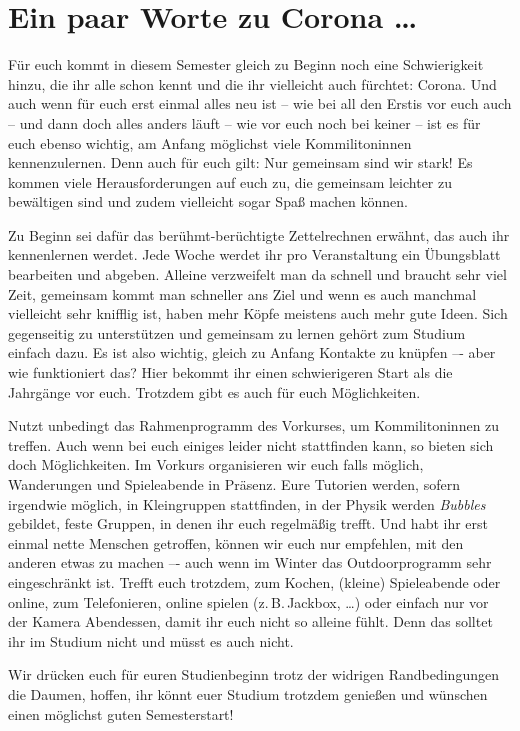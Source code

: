 \section{Ein paar Worte zu Corona \ldots}

Für euch kommt in diesem Semester gleich zu Beginn noch eine Schwierigkeit hinzu, die ihr alle schon kennt und die ihr vielleicht auch fürchtet: Corona.
Und auch wenn für euch erst einmal alles neu ist -- wie bei all den Erstis vor euch auch -- und dann doch alles anders läuft -- wie vor euch noch bei keiner -- ist es für euch ebenso wichtig, am Anfang möglichst viele Kommilitoninnen kennenzulernen. Denn auch für euch gilt: Nur gemeinsam sind wir stark! Es kommen viele Herausforderungen auf euch zu, die gemeinsam leichter zu bewältigen sind und zudem vielleicht sogar Spaß machen können.

Zu Beginn sei dafür das berühmt-berüchtigte Zettelrechnen erwähnt, das auch ihr kennenlernen werdet. Jede Woche werdet ihr pro Veranstaltung ein Übungsblatt bearbeiten und abgeben. Alleine verzweifelt man da schnell und braucht sehr viel Zeit, gemeinsam kommt man schneller ans Ziel und wenn es auch manchmal vielleicht sehr knifflig ist, haben mehr Köpfe meistens auch mehr gute Ideen. Sich gegenseitig zu unterstützen und gemeinsam zu lernen gehört zum Studium einfach dazu. Es ist also wichtig, gleich zu Anfang Kontakte zu knüpfen –- aber wie funktioniert das? Hier bekommt ihr einen schwierigeren Start als die Jahrgänge vor euch. Trotzdem gibt es auch für euch Möglichkeiten.

Nutzt unbedingt das Rahmenprogramm des Vorkurses, um Kommilitoninnen zu treffen. Auch wenn bei euch einiges leider nicht stattfinden kann, so bieten sich doch Möglichkeiten. Im Vorkurs organisieren wir euch falls möglich, Wanderungen und Spieleabende in Präsenz.
Eure Tutorien werden, sofern irgendwie möglich, in Kleingruppen stattfinden, in der Physik werden \emph{Bubbles} gebildet, feste Gruppen, in denen ihr euch regelmäßig trefft.
Und habt ihr erst einmal nette Menschen getroffen, können wir euch nur empfehlen, mit den anderen etwas zu machen –- auch wenn im Winter das Outdoorprogramm sehr eingeschränkt ist. Trefft euch trotzdem, zum Kochen, (kleine) Spieleabende oder online, zum Telefonieren, online spielen (z.\,B.\,Jackbox, \ldots) oder einfach nur vor der Kamera Abendessen, damit ihr euch nicht so alleine fühlt. Denn das solltet ihr im Studium nicht und müsst es auch nicht.

Wir drücken euch für euren Studienbeginn trotz der widrigen Randbedingungen die Daumen, hoffen, ihr könnt euer Studium trotzdem genießen und wünschen einen möglichst guten Semesterstart!